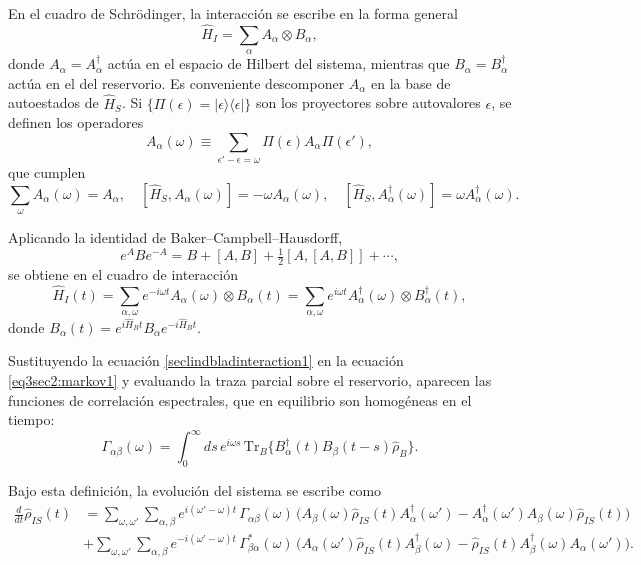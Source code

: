 En el cuadro de Schrödinger, la interacción se escribe en la forma general
\begin{equation*}
    \hat{H}_{I} = \sum_{\alpha} A_{\alpha} \otimes B_{\alpha},
\end{equation*}
donde $A_{\alpha}=A_{\alpha}^{\dagger}$ actúa en el espacio de Hilbert del sistema, mientras que $B_{\alpha}=B_{\alpha}^{\dagger}$ actúa en el del reservorio. Es conveniente descomponer $A_{\alpha}$ en la base de autoestados de $\hat{H}_{S}$. Si $\{\Pi(\epsilon)=|\epsilon\rangle\langle\epsilon|\}$ son los proyectores sobre autovalores $\epsilon$, se definen los operadores
\begin{equation}
    A_{\alpha}(\omega) \equiv \sum_{\epsilon'-\epsilon=\omega} \Pi(\epsilon)A_{\alpha}\Pi(\epsilon'),
    \label{sec1:globalA}
\end{equation}
que cumplen
\[
\sum_{\omega} A_{\alpha}(\omega) = A_{\alpha}, \quad
[\hat{H}_{S}, A_{\alpha}(\omega)] = -\omega A_{\alpha}(\omega), \quad
[\hat{H}_{S}, A_{\alpha}^{\dagger}(\omega)] = \omega A_{\alpha}^{\dagger}(\omega).
\]

Aplicando la identidad de Baker--Campbell--Hausdorff,
\begin{equation}
    e^{A}Be^{-A} = B + [A,B] + \tfrac{1}{2}[A,[A,B]] + \cdots,
    \label{sec2lind:baker}
\end{equation}
se obtiene en el cuadro de interacción
\begin{equation}
    \hat{H}_{I}(t) = \sum_{\alpha,\omega} e^{-i\omega t} A_{\alpha}(\omega) \otimes B_{\alpha}(t)
    = \sum_{\alpha,\omega} e^{i\omega t} A_{\alpha}^{\dagger}(\omega) \otimes B_{\alpha}^{\dagger}(t),
    \label{seclindbladinteraction1}
\end{equation}
donde $B_{\alpha}(t)=e^{i\hat{H}_{B}t}B_{\alpha}e^{-i\hat{H}_{B}t}$.

Sustituyendo la ecuación \eqref{seclindbladinteraction1} en la ecuación \eqref{eq3sec2:markov1} y evaluando la traza parcial sobre el reservorio, aparecen las funciones de correlación espectrales, que en equilibrio son homogéneas en el tiempo:
\begin{equation*}
    \Gamma_{\alpha\beta}(\omega) = \int_{0}^{\infty} ds \, e^{i\omega s}\, 
    \text{Tr}_{B}\{B_{\alpha}^{\dagger}(t)B_{\beta}(t-s)\hat{\rho}_{B}\}.
\end{equation*}

Bajo esta definición, la evolución del sistema se escribe como
\begin{align*}
    \frac{d}{dt}\hat{\rho}_{IS}(t) &=
    \sum_{\omega,\omega'}\sum_{\alpha,\beta} e^{i(\omega'-\omega)t}\, \Gamma_{\alpha\beta}(\omega)\,
    \Big(A_{\beta}(\omega)\hat{\rho}_{IS}(t)A_{\alpha}^{\dagger}(\omega')
        - A_{\alpha}^{\dagger}(\omega')A_{\beta}(\omega)\hat{\rho}_{IS}(t)\Big) \\
    &+ \sum_{\omega,\omega'}\sum_{\alpha,\beta} e^{-i(\omega'-\omega)t}\, \Gamma^{*}_{\beta\alpha}(\omega)\,
    \Big(A_{\alpha}(\omega')\hat{\rho}_{IS}(t)A_{\beta}^{\dagger}(\omega)
        - \hat{\rho}_{IS}(t)A_{\beta}^{\dagger}(\omega)A_{\alpha}(\omega')\Big).
\end{align*}

